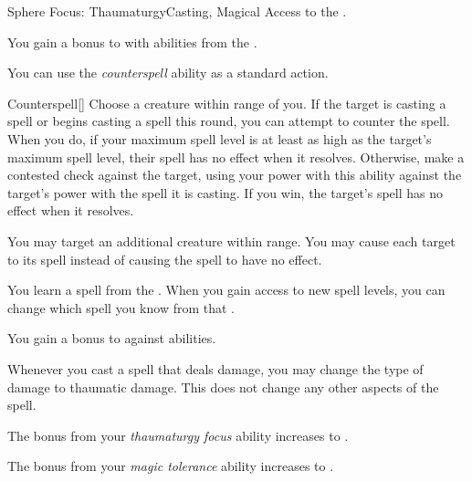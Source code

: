     \begin{feat}{Sphere Focus: Thaumaturgy}{Casting, Magical}
        \featpre Access to the  .

         You gain a  bonus to  with abilities from the  .

         You can use the \textit{counterspell} ability as a standard action.
        \begin{freeability}{Counterspell}[]
            Choose a creature within \rngmed range of you.
            If the target is casting a spell or begins casting a spell this round, you can attempt to counter the spell.
            When you do, if your maximum spell level is at least as high as the target's maximum spell level, their spell has no effect when it resolves.
            Otherwise, make a contested  check against the target, using your power with this ability against the target's power with the spell it is casting.
            If you win, the target's spell has no effect when it resolves.

            \rankline
             You may target an additional creature within range.
             You may cause each target to  its spell instead of causing the spell to have no effect.
        \end{freeability}

         You learn a spell from the  .
        When you gain access to new spell levels, you can change which spell you know from that .

         You gain a  bonus to  against  abilities.

         Whenever you cast a spell that deals damage, you may change the type of damage to thaumatic damage.
        This does not change any other aspects of the spell.

         The bonus from your \textit{thaumaturgy focus} ability increases to .

         The bonus from your \textit{magic tolerance} ability increases to .
    \end{feat}

